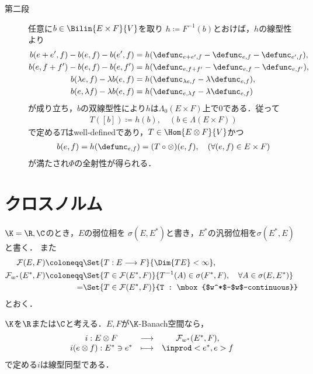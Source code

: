 \begin{prf}
\begin{description}
			\item[第二段]
				任意に$b \in \Bilin{E \times F}{V}$を取り
				$h \coloneqq F^{-1}(b)$とおけば，$h$の線型性より
				\begin{align}
					b(e+e',f) - b(e,f) - b(e',f)
					&= h(\defunc_{e+e',f} - \defunc_{e,f} - \defunc_{e',f}), \\
					b(e,f+f') - b(e,f) - b(e,f')
					&= h(\defunc_{e,f+f'} - \defunc_{e,f} - \defunc_{e,f'}), \\
					b(\lambda e,f) - \lambda b(e,f)
					&= h(\defunc_{\lambda e,f} - \lambda \defunc_{e,f}), \\
					b(e,\lambda f) - \lambda b(e,f)
					&= h(\defunc_{e,\lambda f} - \lambda \defunc_{e,f})
				\end{align}
				が成り立ち，$b$の双線型性により$h$は$\Lambda_0(E \times F)$上で0である．従って
				\begin{align}
					T([b]) \coloneqq h(b),
					\quad (b \in \Lambda(E \times F))
				\end{align}
				で定める$T$はwell-definedであり，$T \in \Hom{E \otimes F}{V}$かつ
				\begin{align}	
					b(e,f) = h(\defunc_{e,f}) = (T \circ \otimes) (e,f),
					\quad (\forall (e,f) \in E \times F)
				\end{align}
				が満たされ$\Phi$の全射性が得られる．
				\QED
		\end{description}
	\end{prf}
	
\section{クロスノルム}
	$\K=\R,\C$のとき，$E$の弱位相を
	$\sigma(E,E^*)$と書き，$E^*$の汎弱位相を$\sigma(E^*,E)$と書く．
	また
	\begin{align}
		\mathcal{F}(E,F)
		\coloneqq &\Set{T:E \longrightarrow F}{\Dim{T E} < \infty}, \\
		\mathcal{F}_{w^*}(E^*,F)
		\coloneqq &\Set{T \in \mathcal{F}(E^*,F)}{T^{-1}(A) \in \sigma(F^*,F),\quad \forall A \in \sigma(E,E^*)} \\
		= &\Set{T \in \mathcal{F}(E^*,F)}{T : \mbox{$w^*$-$w$-continuous}}
	\end{align}
	とおく．
	
	\begin{screen}
		\begin{thm}
			$\K$を$\R$または$\C$と考える．$E,F$が$\K$-Banach空間なら，
			\begin{align}
				\begin{array}{ccc}
					i:E \otimes F & \longrightarrow & \mathcal{F}_{w^*}(E^*,F), \\
					i(e \otimes f): E^* \ni e^* & \longmapsto & \inprod<e^*,e>f 
				\end{array}
			\end{align}
			で定める$i$は線型同型である．
		\end{thm}
	\end{screen}